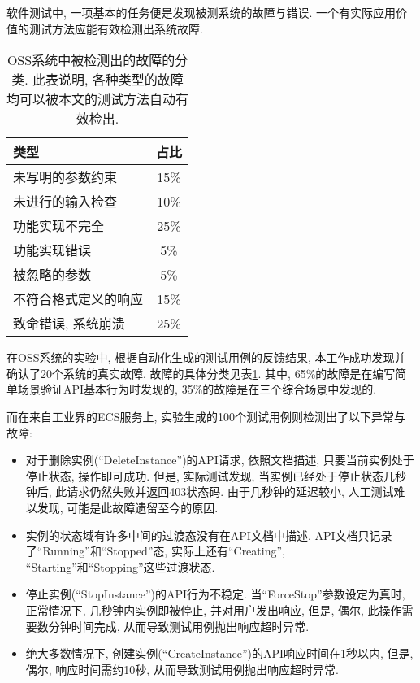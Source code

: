             软件测试中, 一项基本的任务便是发现被测系统的故障与错误. 一个有实际应用价值的测试方法应能有效检测出系统故障.
            
            \begin{table}[!htb]
                \centering
                \begin{tabular}{lc}
                    \toprule
                    类型 & 占比 \\
                    \midrule
                    未写明的参数约束 & 15\% \\
                    未进行的输入检查 & 10\% \\
                    功能实现不完全 & 25\% \\
                    功能实现错误 & 5\% \\
                    被忽略的参数 & 5\% \\
                    不符合格式定义的响应 & 15\% \\
                    致命错误, 系统崩溃 & 25\% \\
                    \bottomrule
                \end{tabular}
                \caption{OSS系统中被检测出的故障的分类. 此表说明, 各种类型的故障均可以被本文的测试方法自动有效检出.}
                \label{tab:oss_bug_classification}
            \end{table}
            
            在OSS系统的实验中, 根据自动化生成的测试用例的反馈结果, 本工作成功发现并确认了20个系统的真实故障. 故障的具体分类见表\ref{tab:oss_bug_classification}. 其中, 65\%的故障是在编写简单场景验证API基本行为时发现的, 35\%的故障是在三个综合场景中发现的.
            
            而在来自工业界的ECS服务上, 实验生成的100个测试用例则检测出了以下异常与故障:
            \begin{itemize}
                \item 对于删除实例(“DeleteInstance”)的API请求, 依照文档描述, 只要当前实例处于停止状态, 操作即可成功. 但是, 实际测试发现, 当实例已经处于停止状态几秒钟后, 此请求仍然失败并返回403状态码. 由于几秒钟的延迟较小, 人工测试难以发现, 可能是此故障遗留至今的原因.
                
                \item 实例的状态域有许多中间的过渡态没有在API文档中描述. API文档只记录了“Running”和“Stopped”态, 实际上还有“Creating”, “Starting”和“Stopping”这些过渡状态.
                
                \item 停止实例(“StopInstance”)的API行为不稳定. 当“ForceStop”参数设定为真时, 正常情况下, 几秒钟内实例即被停止, 并对用户发出响应, 但是, 偶尔, 此操作需要数分钟时间完成, 从而导致测试用例抛出响应超时异常.
                
                \item 绝大多数情况下, 创建实例(“CreateInstance”)的API响应时间在1秒以内, 但是, 偶尔, 响应时间需约10秒, 从而导致测试用例抛出响应超时异常.
            \end{itemize}
            
